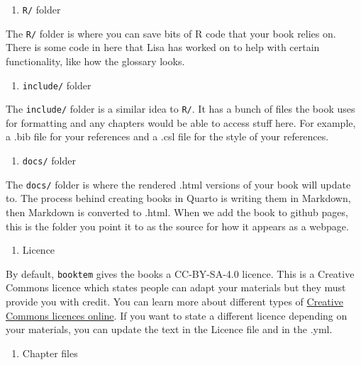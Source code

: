 \documentclass[
  letterpaper,
  DIV=11,
  numbers=noendperiod]{scrreprt}
\providecommand{\tightlist}{%
  \setlength{\itemsep}{0pt}\setlength{\parskip}{0pt}}\usepackage{longtable,booktabs,array}
\begin{document}
\begin{enumerate}
\def\labelenumi{\arabic{enumi}.}
\setcounter{enumi}{2}
\tightlist
\item
  \texttt{R/} folder
\end{enumerate}

The \texttt{R/} folder is where you can save bits of R code that your
book relies on. There is some code in here that Lisa has worked on to
help with certain functionality, like how the glossary looks.

\begin{enumerate}
\def\labelenumi{\arabic{enumi}.}
\setcounter{enumi}{3}
\tightlist
\item
  \texttt{include/} folder
\end{enumerate}

The \texttt{include/} folder is a similar idea to \texttt{R/}. It has a
bunch of files the book uses for formatting and any chapters would be
able to access stuff here. For example, a .bib file for your references
and a .csl file for the style of your references.

\begin{enumerate}
\def\labelenumi{\arabic{enumi}.}
\setcounter{enumi}{4}
\tightlist
\item
  \texttt{docs/} folder
\end{enumerate}

The \texttt{docs/} folder is where the rendered .html versions of your
book will update to. The process behind creating books in Quarto is
writing them in Markdown, then Markdown is converted to .html. When we
add the book to github pages, this is the folder you point it to as the
source for how it appears as a webpage.

\begin{enumerate}
\def\labelenumi{\arabic{enumi}.}
\setcounter{enumi}{5}
\tightlist
\item
  Licence
\end{enumerate}

By default, \texttt{booktem} gives the books a CC-BY-SA-4.0 licence.
This is a Creative Commons licence which states people can adapt your
materials but they must provide you with credit. You can learn more
about different types of \href{https://creativecommons.org/}{Creative
Commons licences online}. If you want to state a different licence
depending on your materials, you can update the text in the Licence file
and in the .yml.

\begin{enumerate}
\def\labelenumi{\arabic{enumi}.}
\setcounter{enumi}{6}
\tightlist
\item
  Chapter files
\end{enumerate}
\end{document}
